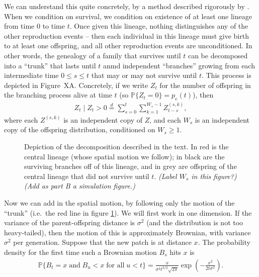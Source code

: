 \documentclass{article}
\renewcommand{\P}{\mathbb{P}}
\newcommand{\deq}{\stackrel{\scriptscriptstyle{d}}{=}}
\newcommand{\plr}[1]{{\it\color{blue}(#1)}}
\begin{document}
We can understand this quite concretely, by a method described rigorously by \citet{geiger1999elementary}.
When we condition on survival, we condition on existence of at least one lineage from time $0$ to time $t$.
Once given this lineage, nothing distinguishes any of the other reproduction events --
then each individual in this lineage must give birth to at least one offspring,
and all other reproduction events are unconditioned.
In other words, the genealogy of a family that survives until $t$
can be decomposed into a ``trunk'' that lasts until $t$
anmd independent ``branches'' growing from each intermediate time $0\le s \le t$ 
that may or may not survive until $t$.
This process is depicted in Figure~XA.
Concretely, if we write $Z_t$ for the number of offspring in the branching process alive at time $t$
(so $\P\{Z_t = 0\} = p_e(t)$),
then
\begin{align}
  Z_t \; \vert \; Z_t>0 \deq \sum_{s=0}^t \sum_{k=1}^{W_s-1} Z^{(s,k)}_{t-s},
\end{align}
where each $Z^{(s,k)}$ is an independent copy of $Z$,
and each $W_s$ is an independent copy of the offspring distribution, conditioned on $W_s \ge 1$.

\begin{figure}[ht!!]
  \begin{center}
  
  \end{center}
\caption{Depiction of the decomposition described in the text.
In red is the central lineage (whose spatial motion we follow);
in black are the surviving branches off of this lineage, 
and in grey are offspring of the central lineage that did not survive until $t$.
\plr{Label $W_s$ in this figure?}
\plr{Add as part B a simulation figure.}
\label{fig:branching_decomp}
}
\end{figure}

Now we can add in the spatial motion, by following only the motion of the ``trunk''
(i.e.\ the red line in figure \ref{fig:branching_decomp}).
We will first work in one dimension.
If the variance of the parent-offspring distance is $\sigma^2$ (and the distribution is not too heavy-tailed),
then the motion of this is approximately Brownian, with variance $\sigma^2$ per generation.
Suppose that the new patch is at distance $x$.
The probability density for the first time such a Brownian motion $B_s$ hits $x$ is
\citep[XXX]{feller}
\begin{align}
  \P\{ B_t=x \;\mbox{and} \; B_u<x \;\mbox{for all}\; u<t\} =  \frac{x}{\sigma^3 t^{3/2}\sqrt{2\pi}} \exp\left(-\frac{x^2}{2t\sigma^2}\right) .
\end{align}
\end{document}
